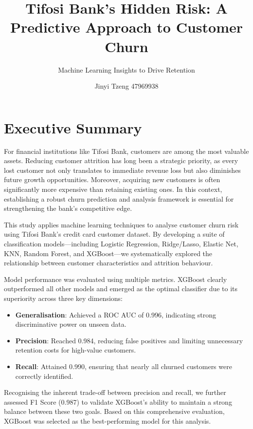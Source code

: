 \documentclass[
  letterpaper,
  DIV=11,
  numbers=noendperiod]{scrartcl}
\title{Tifosi Bank's Hidden Risk: A Predictive Approach to Customer
Churn}
\subtitle{Machine Learning Insights to Drive Retention}
\author{Jinyi Tzeng 47969938}
\date{}
\providecommand{\tightlist}{%
  \setlength{\itemsep}{0pt}\setlength{\parskip}{0pt}}\usepackage{longtable,booktabs,array}
\begin{document}
\maketitle


\newpage

\section{Executive Summary}\label{executive-summary}

For financial institutions like Tifosi Bank, customers are among the
most valuable assets. Reducing customer attrition has long been a
strategic priority, as every lost customer not only translates to
immediate revenue loss but also diminishes future growth opportunities.
Moreover, acquiring new customers is often significantly more expensive
than retaining existing ones. In this context, establishing a robust
churn prediction and analysis framework is essential for strengthening
the bank's competitive edge.

This study applies machine learning techniques to analyse customer churn
risk using Tifosi Bank's credit card customer dataset. By developing a
suite of classification models---including Logistic Regression,
Ridge/Lasso, Elastic Net, KNN, Random Forest, and XGBoost---we
systematically explored the relationship between customer
characteristics and attrition behaviour.

Model performance was evaluated using multiple metrics. XGBoost clearly
outperformed all other models and emerged as the optimal classifier due
to its superiority across three key dimensions:

\begin{itemize}
\tightlist
\item
  \textbf{Generalisation}: Achieved a ROC AUC of 0.996, indicating
  strong discriminative power on unseen data.
\item
  \textbf{Precision}: Reached 0.984, reducing false positives and
  limiting unnecessary retention costs for high-value customers.
\item
  \textbf{Recall}: Attained 0.990, ensuring that nearly all churned
  customers were correctly identified.
\end{itemize}

Recognising the inherent trade-off between precision and recall, we
further assessed F1 Score (0.987) to validate XGBoost's ability to
maintain a strong balance between these two goals. Based on this
comprehensive evaluation, XGBoost was selected as the best-performing
model for this analysis.
\end{document}
